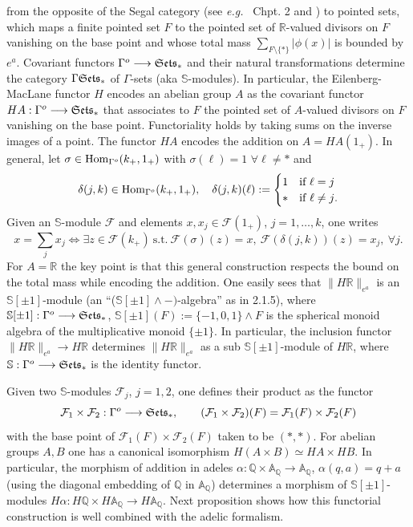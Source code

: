 \documentclass[cupthm]{CUP-JNL-JMJ}
\numberwithin{equation}{section}
\theoremstyle{cupplain}
\theoremstyle{cupdefinition}
\theoremstyle{cupremark}
\theoremstyle{cupproof}
\def\A{{\mathbb A}}
\def\Q{{\mathbb Q}}
\def\R{{\mathbb R}}
\def\S{{\mathbb S}}
\def\cF{{\mathcal F}}
\def\sss{{\S}}
\def\spm{{\sss[\pm 1]}}
\def\Se{\frak{ Sets}}
\def\Ses{{\Se_*}}
\def\Hom {{\rm{Hom}}}
\def\gop{{\Gamma^{o}}}
\newcommand{\eg}{{\it e.g.\/}\ }
\begin{document}
from the opposite of the Segal category (see \eg \cite{DGM} Chpt. 2 and \cite{CCprel})  to pointed sets, which maps a finite pointed set $F$ to the pointed set of $\R$-valued divisors on $F$ vanishing on the base point and whose total mass $\sum_{F\setminus \{*\}} \vert\phi(x)\vert$ is bounded by $e^a$. Covariant functors $\Gamma^{o}\longrightarrow \Se_*$ and their natural transformations determine the category $\Gamma\Ses$ of $\Gamma$-sets (aka $\sss$-modules). In particular, the Eilenberg-MacLane functor $H$  encodes an abelian group $A$ as the covariant functor $HA:\Gamma^{o}\longrightarrow \Se_*$  that associates to  $F$ the pointed set of $A$-valued divisors on $F$ vanishing on the base point. Functoriality holds by taking  sums  on the inverse images of a point. The functor $HA$ encodes the addition on $A=HA(1_+)$. In general, let $\sigma\in \Hom_\gop(k_+,1_+)$ with $\sigma(\ell)=1$ $\forall \ell\neq *$ and
\begin{equation}\label{partmaps}
\delta(j,k)\in \Hom_\gop(k_+,1_+), \quad \delta(j,k)(\ell):=\begin{cases} 1 &\text{if $\ell=j$}\\ * &\text{if $\ell\neq j$}.
\end{cases}
\end{equation} 
Given an $\sss$-module $\cF$ and  elements $x,x_j\in \cF(1_+)$, $j=1,\ldots, k$, one writes 
\begin{equation}\label{defnsum}
x=\sum_j x_j\iff \exists z	\in \cF(k_+)~\text{s.t.}~  \cF(\sigma)(z)=x,~ \cF(\delta(j,k))(z)=x_j,\ \forall j.
\end{equation}
  For $A=\R$ the key point is that this general construction respects the bound on the total mass while encoding the addition. One easily sees that $\| H\R\|_{e^a}$ is an $\spm$-module (an ``($\spm\wedge -)$-algebra'' as in  \cite{DGM} 2.1.5), where  $\spm:  \Gamma^{o}\longrightarrow \Se_*$, $\spm(F):=\{-1,0,1\}\wedge F$ is the spherical monoid algebra of the multiplicative monoid $\{\pm 1\}$. In particular, the inclusion functor $\| H\R\|_{e^a}\longrightarrow H\R$ determines $\| H\R\|_{e^a}$ as  a sub $\spm$-module of $H\R$, where $\sss: \Gamma^{o}\longrightarrow \Se_*$ is the identity functor. 

Given two $\sss$-modules $\cF_j$, $j=1,2$, one defines their  product as the functor
\[
\cF_1 \times \cF_2:\Gamma^{o}\longrightarrow \Se_*, \qquad (\cF_1 \times \cF_2)(F)=\cF_1(F)\times \cF_2(F)
\]
 with the base point of $\cF_1(F)\times \cF_2(F)$ taken to be $(*,*)$. For abelian groups $A,B$ one has a canonical isomorphism $H(A\times B)\simeq HA\times HB$. In particular, 
 the morphism of  addition in adeles $\alpha:\Q\times \A_\Q \to \A_\Q$, $\alpha(q, a) = q+ a$     (using the diagonal embedding of $\Q$ in $\A_\Q$) determines a morphism of $\spm$-modules $H\alpha: H\Q\times H\A_\Q \longrightarrow H\A_\Q$. Next proposition shows how this functorial construction is well combined with the adelic formalism.
 
\end{document}
